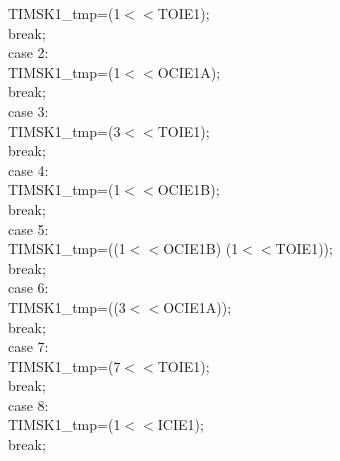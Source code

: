 \documentclass[titlepage, a4paper, 10pt, reqno, openany]{report}
\begin{document}
\begin{minipage}[t]{.35\linewidth}
	\hspace*{1.5cm}			TIMSK1\_tmp=(1$<<$TOIE1); \\
	\hspace*{1.5cm}			break; \\
	\hspace*{1cm}		case 2: \\
	\hspace*{1.5cm}			TIMSK1\_tmp=(1$<<$OCIE1A); \\
	\hspace*{1.5cm}			break; \\
	\hspace*{1cm}		case 3: \\
	\hspace*{1.5cm}			TIMSK1\_tmp=(3$<<$TOIE1); \\
	\hspace*{1.5cm}			break; \\
	\hspace*{1cm}		case 4: \\
	\hspace*{1.5cm}			TIMSK1\_tmp=(1$<<$OCIE1B); \\
	\hspace*{1.5cm}			break; \\
	\hspace*{1cm}		case 5: \\
	\hspace*{1.5cm}			TIMSK1\_tmp=((1$<<$OCIE1B) \textbar (1$<<$TOIE1)); \\
	\hspace*{1.5cm}			break; \\
	\hspace*{1cm}		case 6: \\
	\hspace*{1.5cm}			TIMSK1\_tmp=((3$<<$OCIE1A)); \\
	\hspace*{1.5cm}			break; \\
	\hspace*{1cm}		case 7: \\
	\hspace*{1.5cm}			TIMSK1\_tmp=(7$<<$TOIE1); \\
	\hspace*{1.5cm}			break; \\
	\hspace*{1cm}		case 8: \\
	\hspace*{1.5cm}			TIMSK1\_tmp=(1$<<$ICIE1); \\
	\hspace*{1.5cm}			break; \\

\end{minipage}
\end{document}
